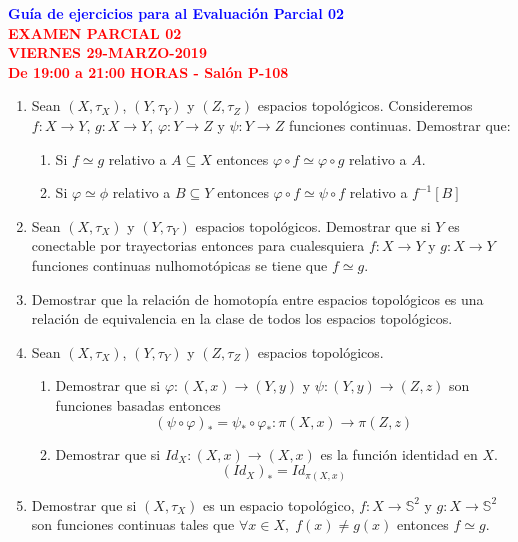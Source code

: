\documentclass[12pt]{report}
\numberwithin{section}{chapter}
\newcommand{\s}{\mathbb S}
\begin{document}
\begin{center}
\textcolor{blue}{\textbf{\large Guía de ejercicios para al Evaluación Parcial 02}}\\
\vspace{0.5 cm}
\textcolor{red}{\textbf{\large EXAMEN PARCIAL 02 \\ VIERNES
29-MARZO-2019\\ De 19:00 a 21:00 HORAS - Salón P-108}}
\end{center}

\begin{enumerate}

\item Sean $(X,\tau_X)$, $(Y,\tau_Y)$ y $(Z, \tau_Z)$ espacios topológicos. Consideremos $f: X \to Y$, $g: X \to Y$, $\varphi: Y \to Z$ y $\psi: Y \to Z$ funciones continuas. Demostrar que:
\begin{enumerate}
\item Si $f \simeq g$ relativo a $A \subseteq X$ entonces $\varphi \circ f \simeq \varphi\circ g$ relativo a $A$.
\item Si $\varphi \simeq \phi$ relativo a $B\subseteq Y$ entonces $\varphi \circ f \simeq \psi \circ f$ relativo a $f^{-1}[B]$
\end{enumerate} 

\item Sean $(X,\tau_X)$ y $(Y,\tau_Y)$ espacios topológicos. Demostrar que si $Y$ es conectable por trayectorias entonces para cualesquiera $f: X \to Y$ y $g : X\to Y$ funciones continuas nulhomotópicas se tiene que $f\simeq g$.

\item Demostrar que la relación de homotopía entre espacios topológicos es una relación de equivalencia en la clase de todos los espacios topológicos.

\item Sean $(X,\tau_X)$, $(Y,\tau_Y)$ y $(Z, \tau_Z)$ espacios topológicos.
\begin{enumerate}
\item Demostrar que si $\varphi: (X,x) \to (Y,y)$ y $\psi: (Y,y) \to (Z,z)$ son funciones basadas entonces
$$(\psi \circ \varphi)_* = \psi_*\circ \varphi_* : \pi(X,x)\to \pi(Z,z)$$

\item Demostrar que si $Id_X: (X,x)\to (X,x)$ es la función identidad en $X$.
$$(Id_X)_* = Id_{\pi(X,x)}$$
\end{enumerate}

\item Demostrar que si $(X, \tau_X)$ es un espacio topológico, $f : X \to \s^2$ y $g :X \to \s^2$ son funciones continuas tales que $\forall x\in X,\; f(x)\neq g(x)$ entonces $f\simeq g$.


\end{enumerate}
\end{document}
